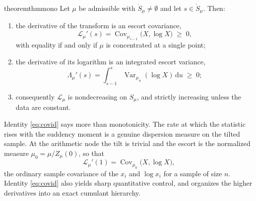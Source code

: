 \documentclass[sn-mathphys-num]{sn-jnl}
\theoremstyle{thmstyleone}%
\theoremstyle{thmstyletwo}%
\theoremstyle{thmstylethree}%
\theoremstyle{thmstyleone}%
\providecommand{\Var}{\operatorname{Var}}
\providecommand{\Cov}{\operatorname{Cov}}
\providecommand{\Leh}{\mathscr{L}}
\providecommand{\dd}{\,\mathrm{d}}
\begin{document}
	\begin{restatable}[Monotonicity]{theorem}{thmmono}\label{thm:mono}
		Let $\mu$ be admissible with $\mathring S_\mu\neq\emptyset$ and let
		$s\in\mathring S_\mu$. Then:
		\begin{enumerate}[label=\textup{(\roman*)},leftmargin=2.2em]
			\item the derivative of the transform is an escort covariance,
			\begin{equation}\label{eq:covid}
				\Leh_\mu'(s)=\Cov_{\mu_{s-1}}\bigl(X,\log X\bigr)\;\ge\;0,
			\end{equation}
			with equality if and only if $\mu$ is concentrated at a single
			point;
			\item the derivative of its logarithm is an integrated escort
			variance,
			\begin{equation}\label{eq:logderiv}
				\Lambda_\mu'(s)
				=\int_{s-1}^{s}\Var_{\mu_u}(\log X)\dd u\;\ge\;0 ;
			\end{equation}
			\item consequently $\Leh_\mu$ is nondecreasing on $S_\mu$, and
			strictly increasing unless the data are constant.
		\end{enumerate}
	\end{restatable}
	
	
	Identity \eqref{eq:covid} says more than monotonicity. The rate at
	which the statistic rises with the suddency moment is a genuine
	dispersion measure on the tilted sample. At the arithmetic node the
	tilt is trivial and the escort is the normalized measure
	$\mu_0=\mu/Z_\mu(0)$, so that
	\begin{equation}\label{eq:slopeatone}
		\Leh_\mu'(1)=\Cov_{\mu_0}\bigl(X,\log X\bigr) ,
	\end{equation}
	the ordinary sample covariance of the $x_i$ and $\log x_i$ for a
	sample of size $n$. Identity \eqref{eq:covid} also yields sharp
	quantitative control, and organizes the higher derivatives into an
	exact cumulant hierarchy.
	
\end{document}
